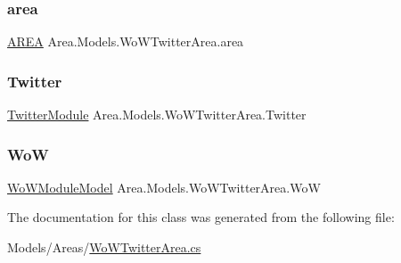 \subsubsection{\texorpdfstring{area}{area}}
{\footnotesize\ttfamily \mbox{\hyperlink{classArea_1_1Models_1_1AREA}{A\+R\+EA}} Area.\+Models.\+Wo\+W\+Twitter\+Area.\+area\hspace{0.3cm}{\ttfamily [private]}}

\mbox{\label{classArea_1_1Models_1_1WoWTwitterArea_a7aec202ca6319dcaf096673c71c1a3f0}} 
\subsubsection{\texorpdfstring{Twitter}{Twitter}}
{\footnotesize\ttfamily \mbox{\hyperlink{classArea_1_1Models_1_1TwitterModule}{Twitter\+Module}} Area.\+Models.\+Wo\+W\+Twitter\+Area.\+Twitter\hspace{0.3cm}{\ttfamily [private]}}

\mbox{\label{classArea_1_1Models_1_1WoWTwitterArea_a7d4e48fafbb29cd9146f9bd83bba6705}} 
\subsubsection{\texorpdfstring{WoW}{WoW}}
{\footnotesize\ttfamily \mbox{\hyperlink{classArea_1_1Models_1_1WoWModuleModel}{Wo\+W\+Module\+Model}} Area.\+Models.\+Wo\+W\+Twitter\+Area.\+WoW\hspace{0.3cm}{\ttfamily [private]}}



The documentation for this class was generated from the following file\+:\begin{DoxyCompactItemize}
\item 
Models/\+Areas/\mbox{\hyperlink{WoWTwitterArea_8cs}{Wo\+W\+Twitter\+Area.\+cs}}\end{DoxyCompactItemize}
